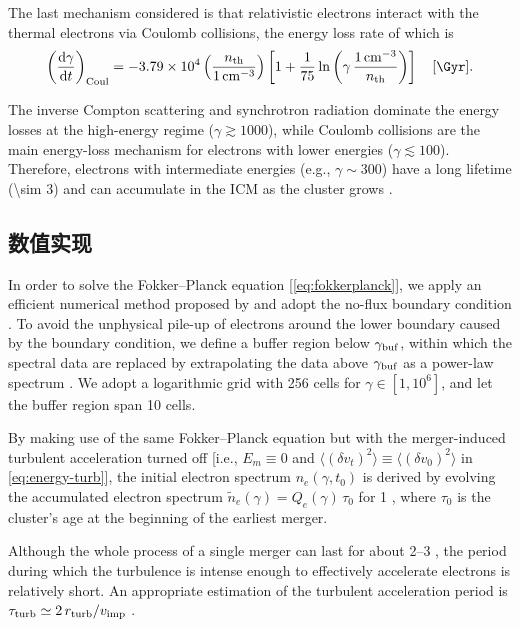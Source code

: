 The last mechanism considered is that relativistic electrons interact
with the thermal electrons via Coulomb collisions, the energy loss rate
of which is
\begin{equation}
  \label{eq:eloss-coul}
  \left( \diff{\gamma}{t} \right)_{\R{Coul}} =
    \num{-3.79e4} \left( \frac{n_{\R{th}}}{\SI{1}{\per\cm\cubed}} \right)
    \left[ 1 + \frac{1}{75} \ln \left(
        \gamma \,\frac{\SI{1}{\per\cm\cubed}}{n_{\R{th}}} \right) \right]
    \quad [\si{\per\Gyr}].
\end{equation}

The inverse Compton scattering and synchrotron radiation dominate
the energy losses at the high-energy regime ($\gamma \gtrsim 1000$),
while Coulomb collisions are the main energy-loss mechanism for electrons
with lower energies ($\gamma \lesssim 100$).
Therefore, electrons with intermediate energies (e.g., $\gamma \sim 300$)
have a long lifetime (\SI{\sim 3}{\Gyr}) and can accumulate in the ICM
as the cluster grows \cite{sarazin1999}.

\subsection{数值实现}
\label{sec:numerical}

In order to solve the Fokker--Planck equation [\autoref{eq:fokkerplanck}],
we apply an efficient numerical method proposed by 
and adopt the no-flux boundary condition \cite{park1996}.
To avoid the unphysical pile-up of electrons around the lower boundary
caused by the boundary condition,
we define a buffer region below $\gamma_{\mathrm{buf}}$, within which
the spectral data are replaced by extrapolating the data above
$\gamma_{\mathrm{buf}}$ as a power-law spectrum \cite{donnert2014}.
We adopt a logarithmic grid with 256 cells for $\gamma \in [1, 10^6]$,
and let the buffer region span 10 cells.

By making use of the same Fokker--Planck equation but with the
merger-induced turbulent acceleration turned off [i.e., $E_m \equiv 0$ and
$\langle (\delta v_t)^2 \rangle \equiv \langle (\delta v_0)^2 \rangle$
in \autoref{eq:energy-turb}],
the initial electron spectrum $n_e(\gamma, t_0)$ is derived by evolving the
accumulated electron spectrum $\tilde{n}_e(\gamma) = Q_e(\gamma) \,\tau_0$
for \SI{1}{\Gyr} \cite{brunetti2007}, where $\tau_0$ is the
cluster's age at the beginning of the earliest merger.

Although the whole process of a single merger can last for about
\SIrange{2}{3}{\Gyr} \cite{tormen2004,cassano2016}, the period
during which the turbulence is intense enough to effectively accelerate
electrons is relatively short.
An appropriate estimation of the turbulent acceleration period is
$\tau_{\mathrm{turb}} \simeq 2 \,r_{\mathrm{turb}} / v_{\mathrm{imp}}$ \cite{miniati2015}.

